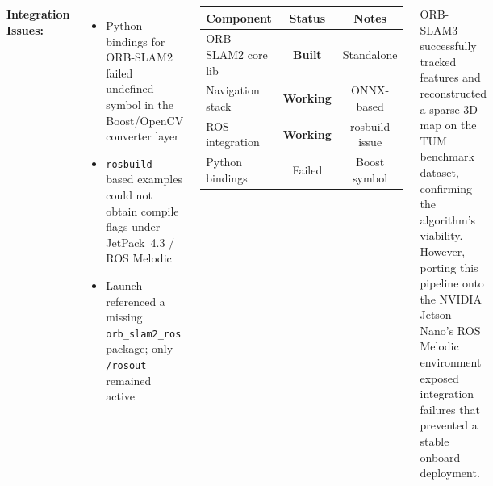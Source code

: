 \documentclass[25pt,a0paper, portrait]{tikzposter}
\begin{document}
\begin{columns}
{{				\textbf{Integration Issues:}
				\begin{itemize}
					\setlength{\itemsep}{2pt}
					\item Python bindings for ORB-SLAM2 failed undefined symbol in the Boost/OpenCV converter layer
					\item \texttt{rosbuild}-based examples could not obtain compile flags under JetPack~4.3 / ROS Melodic
					\item Launch referenced a missing \texttt{orb\_slam2\_ros} package; only \texttt{/rosout} remained active
				\end{itemize}
				
				\vspace{0.1cm}
				
				\begin{center}
					\renewcommand{\arraystretch}{1.0}
					\begin{tabular}{lcc}
						\toprule
						\textbf{Component} & \textbf{Status} & \textbf{Notes} \\
						\midrule
						ORB-SLAM2 core lib & \textbf{Built} & Standalone \\
						Navigation stack   & \textbf{Working} & ONNX-based \\
						ROS integration    & \textbf{Working}         & rosbuild issue \\
						Python bindings    & Failed         & Boost symbol \\
						\bottomrule
					\end{tabular}
				\end{center}
				
				\vspace{0.4cm}
				
				ORB-SLAM3 successfully tracked features and reconstructed a sparse 3D map on the TUM benchmark dataset, confirming the algorithm's viability. However, porting this pipeline onto the NVIDIA Jetson Nano's ROS Melodic environment exposed integration failures that prevented a stable onboard deployment.
			}
		}
		
	\end{columns}
	
\end{document}
